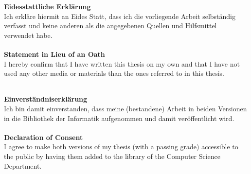 \textbf{Eidesstattliche Erklärung}
\\

Ich erkläre hiermit an Eides Statt, dass ich die vorliegende Arbeit selbständig verfasst und keine anderen als die angegebenen Quellen und Hilfsmittel verwendet habe.
\\\\

\textbf{Statement in Lieu of an Oath}
\\

I hereby confirm that I have written this thesis on my own and that I have not
used any other media or materials than the ones referred to in this thesis.
\\\\

\todo{\monthword{\month} \the\year}

\vspace{5cm}

\textbf{Einverständniserklärung}
\\

Ich bin damit einverstanden, dass meine (bestandene) Arbeit in beiden Versionen
in die Bibliothek der Informatik aufgenommen und damit veröffentlicht wird.
\\\\

\textbf{Declaration of Consent}
\\

I agree to make both versions of my thesis (with a passing grade) accessible to the
public by having them added to the library of the Computer Science Department.
\\\\

